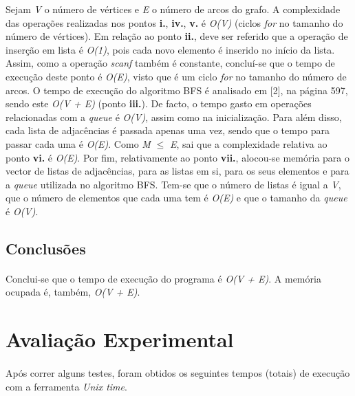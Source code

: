 \documentclass[12pt, a4paper]{article}
\begin{document}
Sejam \textit{V} o número de vértices e \textit{E} o número de arcos do grafo.
A complexidade das operações realizadas nos pontos \textbf{i.}, \textbf{iv.},
\textbf{v.} é \textit{O(V)} (ciclos \textit{for} no tamanho do número de vértices).
Em relação ao ponto \textbf{ii.}, deve ser referido que a operação de inserção
em lista é \textit{O(1)}, pois cada novo elemento é inserido no início da lista.
Assim, como a operação \textit{scanf} também é constante, concluí-se que o tempo
de execução deste ponto é \textit{O(E)}, visto que é um ciclo \textit{for} no
tamanho do número de arcos.
O tempo de execução do algoritmo BFS é analisado em [2], na página 597, sendo
este \textit{O(V + E)} (ponto \textbf{iii.}). De facto, o tempo gasto em
operações relacionadas com a \textit{queue} é \textit{O(V)}, assim como na
inicialização. Para além disso, cada lista de adjacências é passada apenas uma
vez, sendo que o tempo para passar cada uma é \textit{O(E)}.
Como \textit{M} $\leq$ \textit{E}, sai que a complexidade relativa ao
ponto \textbf{vi.} é \textit{O(E)}.
Por fim, relativamente ao ponto \textbf{vii.}, alocou-se memória para o vector
de listas de adjacências, para as listas em si, para os seus elementos e para a
\textit{queue} utilizada no algoritmo BFS. Tem-se que o número de listas é igual
a \textit{V}, que o número de elementos que cada uma tem é \textit{O(E)} e que o
tamanho da \textit{queue} é \textit{O(V)}.

\subsection{Conclusões}
\paragraph{}
Conclui-se que o tempo de execução do programa é \textit{O(V + E)}.
A memória ocupada é, também, \textit{O(V + E)}.


\section{Avaliação Experimental}
\paragraph{}
Após correr alguns testes, foram obtidos os seguintes tempos (totais) de execução com a
ferramenta \textit{Unix time}.
\end{document}
